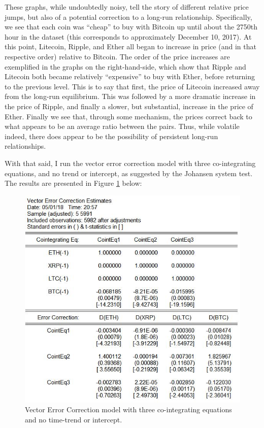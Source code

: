 \documentclass{article}
\begin{document}
	These graphs, while undoubtedly noisy, tell the story of different relative price jumps, but also of a potential correction to a long-run relationship. Specifically, we see that each coin was ``cheap'' to buy with Bitcoin up until about the 2750th hour in the dataset (this corresponds to approximately December 10, 2017). At this point, Litecoin, Ripple, and Ether all began to increase in price (and in that respective order) relative to Bitcoin. The order of the price increases are exemplified in the graphs on the right-hand-side, which show that Ripple and Litecoin both became relatively ``expensive'' to buy with Ether, before returning to the previous level. This is to say that first, the price of Litecoin increased away from the long-run equilibrium. This was followed by a more dramatic increase in the price of Ripple, and finally a slower, but substantial, increase in the price of Ether. Finally we see that, through some mechanism, the prices correct back to what appears to be an average ratio between the pairs. Thus, while volatile indeed, there does appear to be the possibility of persistent long-run relationships.
	
	With that said, I run the vector error correction model with three co-integrating equations, and no trend or intercept, as suggested by the Johansen system test. The results are presented in Figure \ref{VEC} below: 
	
	\begin{figure}[H]
		\centering
		\includegraphics[width = .75\textwidth]{VEC_Results.jpg}
		\caption{Vector Error Correction model with three co-integrating equations and no time-trend or intercept. }
		\label{VEC}
	\end{figure}
\end{document}
